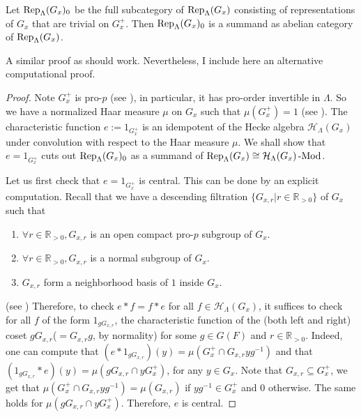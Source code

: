 		
		\begin{lemma}\label{Lem Summand}
			Let $\operatorname{\operatorname{Rep}}_{\Lambda}(G_x)_0$ be the full subcategory of $\operatorname{\operatorname{Rep}}_{\Lambda}(G_x)$ consisting of representations of $G_x$ that are trivial on $G_x^+$. Then $\operatorname{\operatorname{Rep}}_{\Lambda}(G_x)_0$ is a summand as abelian category of $\operatorname{\operatorname{Rep}}_{\Lambda}(G_x)$.
		\end{lemma}
		
		\begin{remark}
			A similar proof as \cite[Appendix]{dat2009finitude} should work. Nevertheless, I include here an alternative computational proof. 
		\end{remark}
		
		\begin{proof}
			Note $G_x^+$ is pro-$p$ (see \cite[II.5.2.(b)]{vigneras1996representations}), in particular, it has pro-order invertible in $\Lambda$. So we have a normalized Haar measure $\mu$ on $G_x$ such that $\mu(G_x^+)=1$ (see \cite[I.2.4]{vigneras1996representations}). The characteristic function $e:=1_{G_x^+}$ is an idempotent of the Hecke algebra $\mathcal{H}_{\Lambda}(G_x)$ under convolution with respect to the Haar measure $\mu$. We shall show that $e=1_{G_x^+}$ cuts out $\operatorname{\operatorname{Rep}}_{\Lambda}(G_x)_0$ as a summand of $\operatorname{\operatorname{Rep}}_{\Lambda}(G_x) \cong \mathcal{H}_{\Lambda}(G_x)\operatorname{-Mod}$.
			
			Let us first check that $e=1_{G_x^+}$ is central. This can be done by an explicit computation. Recall that we have a descending filtration $\{G_{x,r} | r\in \mathbb{R}_{>0}\}$ of $G_x$ such that 
			\begin{enumerate}
				\item $\forall r \in \mathbb{R}_{>0}, G_{x,r}$ is an open compact pro-$p$ subgroup of $G_x$.
				\item $\forall r \in \mathbb{R}_{>0}, G_{x,r}$ is a normal subgroup of $G_x$.
				\item $G_{x,r}$ form a neighborhood basis of $1$ inside $G_x$. 
			\end{enumerate}
			(see \cite[II.5.1]{vigneras1996representations}) Therefore, to check $e \ast f=f \ast e$ for all $f \in \mathcal{H}_{\Lambda}(G_x)$, it suffices to check for all $f$ of the form $1_{gG_{x,r}}$, the characteristic function of the (both left and right) coset $gG_{x,r}$($=G_{x,r}g$, by normality) for some $g \in G(F)$ and $r \in \mathbb{R}_{>0}$. Indeed, one can compute that $(e \ast 1_{gG_{x,r}})(y)=\mu(G_x^+\cap G_{x,r}yg^{-1})$ and that $(1_{gG_{x,r}} \ast e)(y)=\mu(gG_{x,r}\cap yG_x^+)$, for any $y \in G_x$. Note that $G_{x,r} \subseteq G_x^+$, we get that $\mu(G_x^+\cap G_{x,r}yg^{-1})=\mu(G_{x,r})$ if $yg^{-1} \in G_x^+$ and $0$ otherwise. The same holds for $\mu(gG_{x,r}\cap yG_x^+)$. Therefore, $e$ is central.
			

\end{proof}

